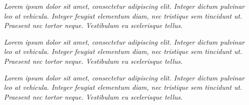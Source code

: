 \onecolumn


{%
\centering
    \vspace*{3em}
    {%
        \fontsize{16pt}{0pt}\selectfont%
        \textit{%
            Lorem ipsum dolor sit amet, consectetur adipiscing elit. Integer dictum%
            pulvinar leo at vehicula. Integer feugiat elementum diam, nec tristique sem%
            tincidunt ut. Praesent nec tortor neque. Vestibulum eu scelerisque tellus.}%
        \par%
    }%

    \vspace*{5em}%
    \vspace*{5em}%

    {%
        \fontsize{16pt}{0pt}\selectfont%
        \textit{%
            Lorem ipsum dolor sit amet, consectetur adipiscing elit. Integer dictum%
            pulvinar leo at vehicula. Integer feugiat elementum diam, nec tristique sem%
            tincidunt ut. Praesent nec tortor neque. Vestibulum eu scelerisque tellus.}%
        \par%
    }%

    \vspace*{5em}%
    \vspace*{5em}%

    {%
        \fontsize{16pt}{0pt}\selectfont%
        \textit{%
            Lorem ipsum dolor sit amet, consectetur adipiscing elit. Integer dictum%
            pulvinar leo at vehicula. Integer feugiat elementum diam, nec tristique sem%
            tincidunt ut. Praesent nec tortor neque. Vestibulum eu scelerisque tellus.}%
        \par%
    }%
}

\thispagestyle{empty}
\vspace*{3em}

